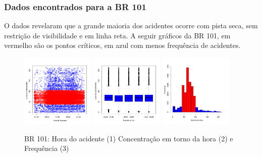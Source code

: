 \documentclass[11pt]{beamer}
\begin{document}
\begin{frame}\frametitle{Dados encontrados para a BR 101}
  O dados revelaram que a grande maioria dos acidentes ocorre com pista seca, sem restrição de visibilidade e em linha reta.
  A seguir gráficos da BR 101, em vermelho são os pontos críticos, em azul com menos frequência de acidentes.
	\pause
  \begin{figure}[h]
	\includegraphics[width=3.5cm,height=3.5cm]{Figuras/Preprocess/br101.png}
	\includegraphics[width=3.5cm,height=3.5cm]{Figuras/Preprocess/br101_2.png}
	\includegraphics[width=3.5cm,height=3.5cm]{Figuras/Preprocess/br101_4.png}
	\caption{BR 101: Hora do acidente (1) Concentração em torno da hora (2) e Frequência (3)}
  \end{figure}
\end{frame}
\end{document}
